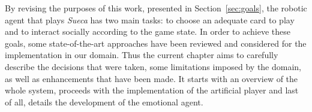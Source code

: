 \label{chapter:approach}

By revising the purposes of this work, presented in Section~\ref{sec:goals}, the robotic agent that plays \emph{Sueca} has two main tasks: to choose an adequate card to play and to interact socially according to the game state.
In order to achieve these goals, some state-of-the-art approaches have been reviewed and considered for the implementation in our domain.
Thus the current chapter aims to carefully describe the decisions that were taken, some limitations imposed by the domain, as well as enhancements that have been made.
It starts with an overview of the whole system, proceeds with the implementation of the artificial player and last of all, details the development of the emotional agent.





\clearpage

